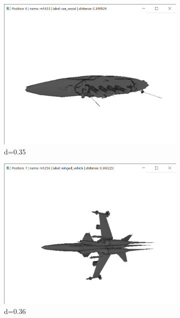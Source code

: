 \documentclass{bigdata}
\begin{document}
\begin{figure}[h!]
\begin{subfigure}[b]{0.09\linewidth}
    \includegraphics[width=\linewidth]{Pictures/Evaluation/m42/pos6.png}
    \caption*{d=0.35}
  \end{subfigure}
  \begin{subfigure}[b]{0.09\linewidth}
    \includegraphics[width=\linewidth]{Pictures/Evaluation/m42/pos7.png}
    \caption*{d=0.36}
  \end{subfigure}
  \begin{subfigure}[b]{0.09\linewidth}

\end{subfigure}
\end{figure}
\end{document}
